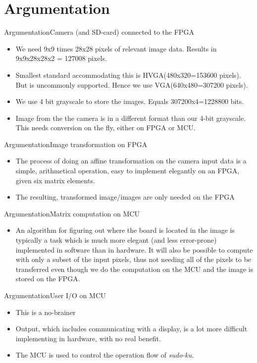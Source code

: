 \documentclass[10pt]{beamer}
\begin{document}
\section{Argumentation}
\begin{frame}{Argumentation}{Camera (and SD-card) connected to the FPGA}
\begin{itemize}
\item We need 9x9 times 28x28 pixels of relevant image data. Results in 9x9x28x28x2 = 127008 pixels.
\item Smallest standard accommodating this is HVGA(480x320=153600 pixels). But is uncommonly supported. Hence we use VGA(640x480=307200 pixels).
\item We use 4 bit grayscale to store the images. Equals 307200x4=1228800 bits.
\item Image from the the camera is in a different format than our 4-bit grayscale. This needs conversion on the fly, either on FPGA or MCU.
\end{itemize}
\end{frame}

\begin{frame}{Argumentation}{Image transformation on FPGA}
\begin{itemize}
\item The process of doing an affine transformation on the camera input data is a simple, arithmetical operation, easy to implement elegantly on an FPGA, given six matrix elements.
\item The resulting, transformed image/images are only needed on the FPGA
\end{itemize}
\end{frame}

\begin{frame}{Argumentation}{Matrix computation on MCU}
\begin{itemize}
\item An algorithm for figuring out where the board is located in the image is typically a task which is much more elegant (and less error-prone) implemented in software than in hardware. It will also be possible to compute with only a subset of the input pixels, thus not needing all of the pixels to be transferred even though we do the computation on the MCU and the image is stored on the FPGA.
\end{itemize}
\end{frame}

\begin{frame}{Argumentation}{User I/O on MCU}
\begin{itemize}
\item This is a no-brainer
\item Output, which includes communicating with a display, is a lot more difficult implementing in hardware, with no real benefit.
\item The MCU is used to control the operation flow of \textit{sudo-ku}.
\end{itemize}
\end{frame}
\end{document}
